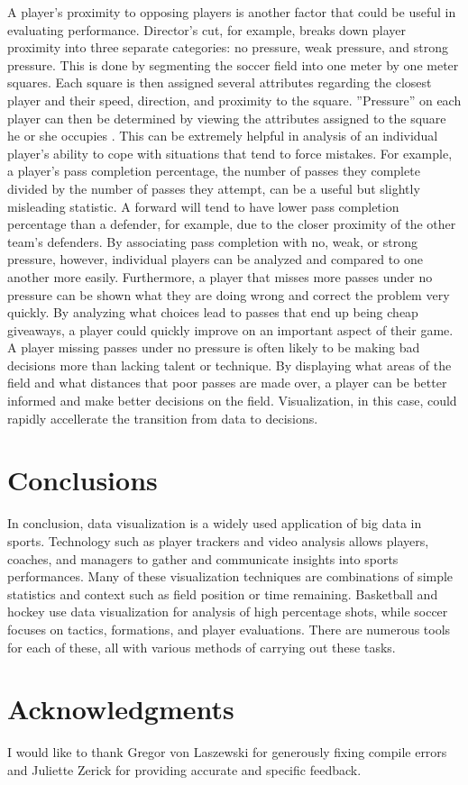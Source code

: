 \documentclass[sigconf]{acmart}
\begin{document}
A player’s proximity to opposing players is another factor that could be useful in evaluating performance. Director’s cut, for example, breaks down player proximity into three separate categories: no pressure, weak pressure, and strong pressure. This is done by segmenting the soccer field into one meter by one meter squares. Each square is then assigned several attributes regarding the closest player and their speed, direction, and proximity to the square. ''Pressure'' on each player can then be determined by viewing the attributes assigned to the square he or she occupies \cite{directorscut}. This can be extremely helpful in analysis of an individual player’s ability to cope with situations that tend to force mistakes. For example, a player’s pass completion percentage, the number of passes they complete divided by the number of passes they attempt, can be a useful but slightly misleading statistic. A forward will tend to have lower pass completion percentage than a defender, for example, due to the closer proximity of the other team’s defenders. By associating pass completion with no, weak, or strong pressure, however, individual players can be analyzed and compared to one another more easily. Furthermore, a player that misses more passes under no pressure can be shown what they are doing wrong and correct the problem very quickly. By analyzing what choices lead to passes that end up being cheap giveaways, a player could quickly improve on an important aspect of their game. A player missing passes under no pressure is often likely to be making bad decisions more than lacking talent or technique. By displaying what areas of the field and what distances that poor passes are made over, a player can be better informed and make better decisions on the field. Visualization, in this case, could rapidly accellerate the transition from data to decisions.

\section{Conclusions}

In conclusion, data visualization is a widely used application of big data in sports. Technology such as player trackers and video analysis allows players, coaches, and managers to gather and communicate insights into sports performances. Many of these visualization techniques are combinations of simple statistics and context such as field position or time remaining. Basketball and hockey use data visualization for analysis of high percentage shots, while soccer focuses on tactics, formations, and player evaluations. There are numerous tools for each of these, all with various methods of carrying out these tasks.

\section{Acknowledgments}

I would like to thank Gregor von Laszewski for generously fixing compile errors and Juliette Zerick for providing accurate and specific feedback.


 
\end{document}
